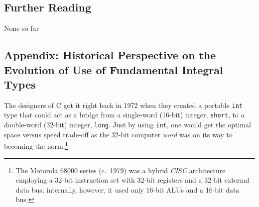 \subsection[Further Reading]{Further Reading}\label{further-reading}

None so far

\subsection[Appendix: Historical Perspective on the Evolution of Use of Fundamental Integral Types]{Appendix: Historical Perspective on the Evolution of Use of Fundamental Integral Types}\label{longlong-appendix}
\label{historical-perspective-on-the-evolution-of-use-of-fundamental-integral-types}

The designers of C got it right back in 1972 when
they created a portable \texttt{int} type that could act as a bridge
from a single-word (16-bit) integer, \texttt{short}, to a double-word
(32-bit) integer, \texttt{long}. Just by using \texttt{int}, one would
get the optimal space versus speed trade-off as the 32-bit computer \emph{word}
was on its way to becoming the norm.{\cprotect\footnote{The Motorola
68000 series (c.~1979) was a hybrid \emph{CISC} architecture employing
a 32-bit instruction set with 32-bit registers and a 32-bit external
data bus; internally, however, it used only 16-bit ALUs and a 16-bit
data bus.}}

